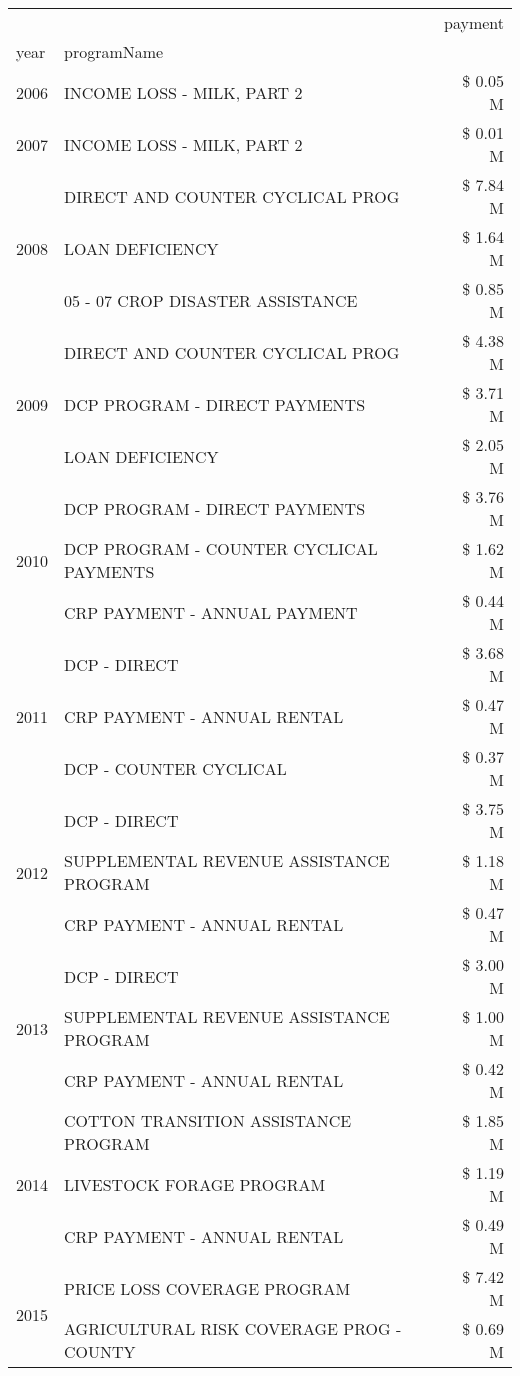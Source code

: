 \begin{tabular}{llr}
\toprule
 &  & payment \\
year & programName &  \\
\midrule
2006 & INCOME LOSS - MILK, PART 2 & \$ 0.05 M \\
\cline{1-3}
2007 & INCOME LOSS - MILK, PART 2 & \$ 0.01 M \\
\cline{1-3}
\multirow[t]{3}{*}{2008} & DIRECT AND COUNTER CYCLICAL PROG & \$ 7.84 M \\
 & LOAN DEFICIENCY & \$ 1.64 M \\
 & 05 - 07 CROP DISASTER ASSISTANCE & \$ 0.85 M \\
\cline{1-3}
\multirow[t]{3}{*}{2009} & DIRECT AND COUNTER CYCLICAL PROG & \$ 4.38 M \\
 & DCP PROGRAM - DIRECT PAYMENTS & \$ 3.71 M \\
 & LOAN DEFICIENCY & \$ 2.05 M \\
\cline{1-3}
\multirow[t]{3}{*}{2010} & DCP PROGRAM - DIRECT PAYMENTS & \$ 3.76 M \\
 & DCP PROGRAM - COUNTER CYCLICAL PAYMENTS & \$ 1.62 M \\
 & CRP PAYMENT - ANNUAL PAYMENT & \$ 0.44 M \\
\cline{1-3}
\multirow[t]{3}{*}{2011} & DCP - DIRECT & \$ 3.68 M \\
 & CRP PAYMENT - ANNUAL RENTAL & \$ 0.47 M \\
 & DCP - COUNTER CYCLICAL & \$ 0.37 M \\
\cline{1-3}
\multirow[t]{3}{*}{2012} & DCP - DIRECT & \$ 3.75 M \\
 & SUPPLEMENTAL REVENUE ASSISTANCE PROGRAM & \$ 1.18 M \\
 & CRP PAYMENT - ANNUAL RENTAL & \$ 0.47 M \\
\cline{1-3}
\multirow[t]{3}{*}{2013} & DCP - DIRECT & \$ 3.00 M \\
 & SUPPLEMENTAL REVENUE ASSISTANCE PROGRAM & \$ 1.00 M \\
 & CRP PAYMENT - ANNUAL RENTAL & \$ 0.42 M \\
\cline{1-3}
\multirow[t]{3}{*}{2014} & COTTON TRANSITION ASSISTANCE PROGRAM & \$ 1.85 M \\
 & LIVESTOCK FORAGE PROGRAM & \$ 1.19 M \\
 & CRP PAYMENT - ANNUAL RENTAL & \$ 0.49 M \\
\cline{1-3}
\multirow[t]{3}{*}{2015} & PRICE LOSS COVERAGE PROGRAM & \$ 7.42 M \\
 & AGRICULTURAL RISK COVERAGE PROG - COUNTY & \$ 0.69 M \\

\end{tabular}
